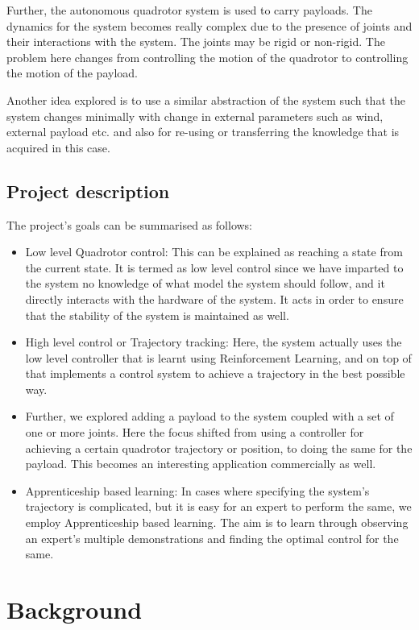 \documentclass[hidelinks,BTech]{iitmdiss}
\begin{document}
Further, the autonomous quadrotor system is used to carry payloads. The dynamics for the system becomes really complex due to the presence of joints and their interactions with the system. The joints may be rigid or non-rigid. The problem here changes from controlling the motion of the quadrotor to controlling the motion of the payload. 

Another idea explored is to use a similar abstraction of the system such that the system changes minimally with change in external parameters such as wind, external payload etc. and also for re-using or transferring the knowledge that is acquired in this case. 

\section{Project description}
The project's goals can be summarised as follows:
\begin{itemize}
	\item {Low level Quadrotor control: This can be explained as reaching a state from the current state. It is termed as low level control since we have imparted to the system no knowledge of what model the system should follow, and it directly interacts with the hardware of the system. It acts in order to ensure that the stability of the system is maintained as well.}
	\item {High level control or Trajectory tracking: Here, the system actually uses the low level controller that is learnt using Reinforcement Learning, and on top of that implements a control system to achieve a trajectory in the best possible way.}
	\item {Further, we explored adding a payload to the system coupled with a set of one or more joints. Here the focus shifted from using a controller for achieving a certain quadrotor trajectory or position, to doing the same for the payload. This becomes an interesting application commercially as well.}
	\item {Apprenticeship based learning: In cases where specifying the system's trajectory is complicated, but it is easy for an expert to perform the same, we employ Apprenticeship based learning. The aim is to learn through observing an expert's multiple demonstrations and finding the optimal control for the same.}
\end{itemize}

\chapter{Background}
\end{document}
